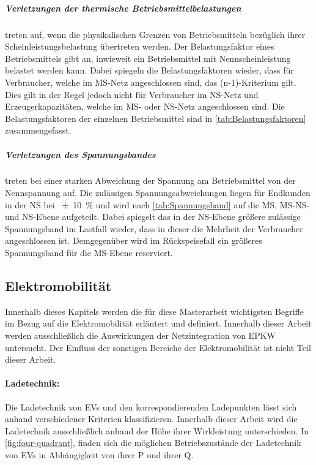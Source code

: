 \subparagraph{Verletzungen der thermische Betriebsmittelbelastungen} treten auf, wenn die physikalischen Grenzen von Betriebsmitteln bezüglich ihrer Scheinleistungsbelastung übertreten werden.
Der Belastungsfaktor eines Betriebsmittels gibt an, inwieweit ein Betriebsmittel mit Nennscheinleistung belastet werden kann.
Dabei spiegeln die Belastungsfaktoren wieder, dass für Verbraucher, welche im \gls{MS}-Netz angeschlossen sind, das (n-1)-Kriterium  gilt.
Dies gilt in der Regel jedoch nicht für Verbraucher im \gls{NS}-Netz und Erzeugerkapazitäten, welche im \gls{MS}- oder \gls{NS}-Netz angeschlossen sind.
Die Belastungsfaktoren der einzelnen Betriebsmittel sind in \autoref{tab:Belastungsfaktoren} zusammengefasst. \cite{Schachler} \cite{Rehtanz2017}





\subparagraph{Verletzungen des Spannungsbandes} treten bei einer starken Abweichung der Spannung am Betriebsmittel von der Nennspannung auf.
Die zulässigen Spannungsabweichungen liegen für Endkunden in der \gls{NS} bei \SI{\pm 10}{\percent} und wird nach \autoref{tab:Spannungsband} auf die \gls{MS}, \gls{MS}-\gls{NS}- und \gls{NS}-Ebene aufgeteilt.
Dabei spiegelt das in der \gls{NS}-Ebene größere zulässige Spannungsband im Lastfall wieder, dass in dieser die Mehrheit der Verbraucher angeschlossen ist.
Demgegenüber wird im Rückspeisefall ein größeres Spannungsband für die \gls{MS}-Ebene reserviert. \cite{Schachler} \cite{Rehtanz2017}




\subsection{Elektromobilität}

Innerhalb dieses Kapitels werden die für diese Masterarbeit wichtigsten Begriffe im Bezug auf die Elektromobilität erläutert und definiert.
Innerhalb dieser Arbeit werden ausschließlich die Auswirkungen der Netzintegration von \gls{EPKW} untersucht.
Der Einfluss der sonstigen Bereiche der Elektromobilität ist nicht Teil dieser Arbeit.


\paragraph{Ladetechnik:}

Die Ladetechnik von \glspl{EV} und den korrespondierenden Ladepunkten lässt sich anhand verschiedener Kriterien klassifizieren.
Innerhalb dieser Arbeit wird die Ladetechnik ausschließlich anhand der Höhe ihrer Wirkleistung unterschieden.
In \autoref{fig:four-quadrant}, finden sich die möglichen Betriebszustände der Ladetechnik von \glspl{EV} in Abhängigkeit von ihrer \gls{P} und ihrer \gls{Q}.

